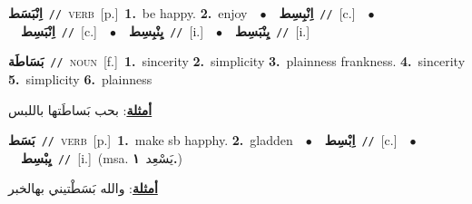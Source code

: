 \documentclass[10pt,a4paper,twoside]{article} %
\begin{document}
\begin{multicols}{2}
{\setlength\topsep{0pt}\textbf{\foreignlanguage{arabic}{اِنْبَسَط}}\ {\color{gray}\texttt{//}\color{black}}\ \textsc{verb}\ [p.]\ \textbf{1.}~be happy.  \textbf{2.}~enjoy\ \ $\bullet$\ \ \setlength\topsep{0pt}\textbf{\foreignlanguage{arabic}{اِنْبِسِط}}\ {\color{gray}\texttt{//}\color{black}}\ [c.]\ \ $\bullet$\ \ \setlength\topsep{0pt}\textbf{\foreignlanguage{arabic}{اِنْبَسِط}}\ {\color{gray}\texttt{//}\color{black}}\ [c.]\ \ $\bullet$\ \ \setlength\topsep{0pt}\textbf{\foreignlanguage{arabic}{يِنْبِسِط}}\ {\color{gray}\texttt{//}\color{black}}\ [i.]\ \ $\bullet$\ \ \setlength\topsep{0pt}\textbf{\foreignlanguage{arabic}{يِنْبَسِط}}\ {\color{gray}\texttt{//}\color{black}}\ [i.]\ } \vspace{2mm}

{\setlength\topsep{0pt}\textbf{\foreignlanguage{arabic}{بَسَاطَة}}\ {\color{gray}\texttt{//}\color{black}}\ \textsc{noun}\ [f.]\ \textbf{1.}~sincerity  \textbf{2.}~simplicity  \textbf{3.}~plainness frankness.  \textbf{4.}~sincerity  \textbf{5.}~simplicity  \textbf{6.}~plainness\  \begin{flushright}\color{gray}\foreignlanguage{arabic}{\textbf{\underline{\foreignlanguage{arabic}{أمثلة}}}: بحب بَساطَتها باللبس}\end{flushright}\color{black}} \vspace{2mm}

{\setlength\topsep{0pt}\textbf{\foreignlanguage{arabic}{بَسَط}}\ {\color{gray}\texttt{//}\color{black}}\ \textsc{verb}\ [p.]\ \textbf{1.}~make sb happhy.  \textbf{2.}~gladden\ \ $\bullet$\ \ \setlength\topsep{0pt}\textbf{\foreignlanguage{arabic}{اِبْسِط}}\ {\color{gray}\texttt{//}\color{black}}\ [c.]\ \ $\bullet$\ \ \setlength\topsep{0pt}\textbf{\foreignlanguage{arabic}{يِبْسِط}}\ {\color{gray}\texttt{//}\color{black}}\ [i.]\ \color{gray}(msa. \foreignlanguage{arabic}{يَسْعِد}~\foreignlanguage{arabic}{\textbf{١.}})\color{black}\  \begin{flushright}\color{gray}\foreignlanguage{arabic}{\textbf{\underline{\foreignlanguage{arabic}{أمثلة}}}: والله بَسَطْتيني بهالخبر}\end{flushright}\color{black}} \vspace{2mm}


\end{multicols}
\end{document}
